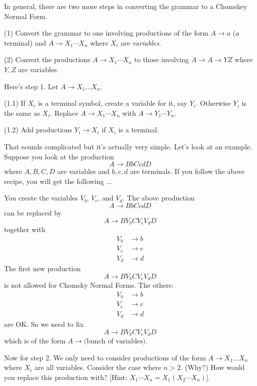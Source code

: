\vfill\eject

In general, there are two more steps in converting the grammar to
a Chomskey Normal Form.
\begin{mylist}
 \item[(1)] Convert the grammar to one involving productions of
 the form $A \rightarrow a$ ($a$ terminal) and $A \rightarrow X_1
 \cdots X_n$ where $X_i$ are \textit{ variables}.
 \item[(2)] Convert the productions $A \rightarrow X_1 \cdots X_n$
 to those involving $A \rightarrow A \rightarrow YZ$ where $Y,Z$
 are variables.
\end{mylist}

Here's step 1. Let $A \rightarrow X_1 \ldots X_n$.
\begin{mylist}
\item[(1.1)] If $X_i$ is a terminal symbol, create a variable for
it, say $Y_i$. Otherwise $Y_i$ is the same as $X_i$.  Replace $A
\rightarrow X_1 \cdots X_n$ with $A \rightarrow Y_1 \cdots Y_n$.
\item[(1.2)] Add productions $Y_i \rightarrow X_i$ if $X_i$ is a
terminal.
\end{mylist}

That sounds complicated but it's actually very simple. 
Let's look at an example.
Suppose you look at the production
\[
 A \rightarrow BbCcdD
\]
where $A,B,C,D$ are variables and $b,c,d$ are terminals. 
If you follow the above recipe, you will get the following ...

You create the variables $V_b$, $V_c$, and $V_d$.
The above production
\[
 A \rightarrow BbCcdD
\]
can be replaced by 
\[
A \rightarrow BV_bCV_cV_dD
\] 
together with 
\begin{align*}
V_b &\rightarrow b \\
V_c &\rightarrow c \\
V_d &\rightarrow d
\end{align*}
The first new production
\[
A \rightarrow BV_bCV_cV_dD
\] 
is not allowed for Chomsky Normal Forms.
The others:
\begin{align*}
V_b &\rightarrow b \\
V_c &\rightarrow c \\
V_d &\rightarrow d
\end{align*}
are OK.
So we need to fix
\[
A \rightarrow BV_bCV_cV_dD
\] 
which is of the form $A \rightarrow \text{(bunch of variables)}$.

Now for step 2. We only need to consider productions of the form
$A \rightarrow X_1 \ldots X_n$ where $X_i$ are all variables.
Consider the case where $n>2$. (Why?) How would you replace
this production with? [Hint: $X_1 \cdots X_n = X_1 (X_2 \cdots
X_n)$].

